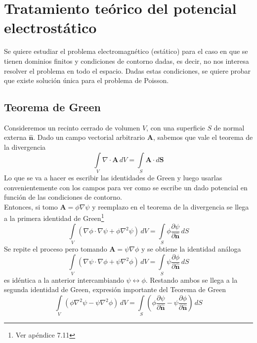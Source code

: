 \newpage
\section{Tratamiento teórico del potencial electrostático}
Se quiere estudiar el problema electromagnético (estático) para el caso en que se tienen dominios finitos y condiciones de contorno dadas, es decir, no nos interesa resolver el problema en todo el espacio. Dadas estas condiciones, se quiere probar que existe solución única para el problema de Poisson.




\subsection{Teorema de Green}
Consideremos un recinto cerrado de volumen $V$, con una superficie $S$ de normal externa $\hat{\textbf{n}}$. Dado un campo vectorial arbitrario $\textbf{A}$, sabemos que vale el teorema de la divergencia
\begin{equation*}
    \int\limits_{V}\nabla\cdot\textbf{A}\,dV =
    \int\limits_{S}\textbf{A}\cdot d\textbf{S}
\end{equation*}
Lo que se va a hacer es escribir las identidades de Green y luego usarlas convenientemente con los campos para ver como se escribe un dado potencial en función de las condiciones de contorno.\\
\indent Entonces, si tomo $\textbf{A} = \phi \nabla \psi$ y reemplazo en el teorema de la divergencia se llega a la primera identidad de Green\footnote{Ver apéndice 7.11}
\begin{equation*}
    \int\limits_{V}
    \left(
        \nabla \phi \cdot \nabla \psi + \phi \nabla^{2}\psi
    \right)\,dV
    = \int\limits_{S} \phi \frac{\partial \psi}{\partial \hat{\textbf{n}}}\,dS
\end{equation*}
Se repite el proceso pero tomando $\textbf{A} = \psi \nabla \phi$ y se obtiene la identidad análoga
\begin{equation*}
    \int\limits_{V}
    \left(
        \nabla \psi \cdot \nabla \phi + \psi \nabla^{2}\phi
    \right)\,dV
    = \int\limits_{S} \psi \frac{\partial \phi}{\partial \hat{\textbf{n}}}\,dS
\end{equation*}
es idéntica a la anterior intercambiando $\psi \longleftrightarrow \phi$. Restando ambos se llega a la segunda identidad de Green, expresión importante del Teorema de Green
\begin{equation}
    \int\limits_{V}
    \left(
        \phi \nabla^{2}\psi - \psi \nabla^{2}\phi
    \right)\,dV = 
    \int\limits_{S}
    \left(
        \phi\frac{\partial \psi}{\partial\hat{\textbf{n}}}
        -
        \psi\frac{\partial \phi}{\partial\hat{\textbf{n}}}
    \right)\,dS
        \label{ec:TeoremaGreen}
\end{equation}
